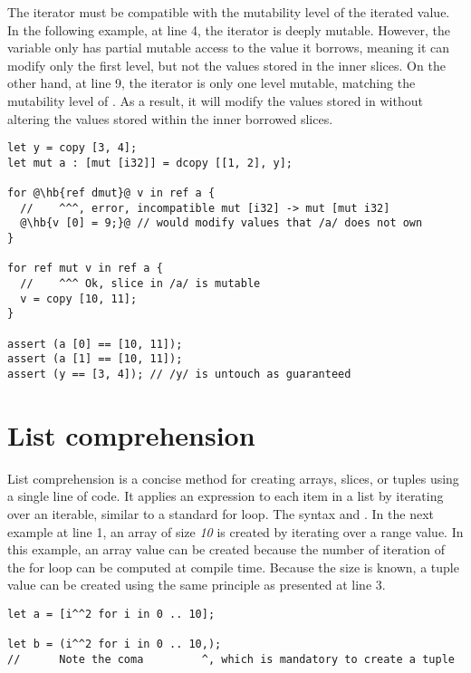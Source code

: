 The iterator must be compatible with the mutability level of the iterated value.
In the following example, at line 4, the iterator is deeply mutable. However,
the variable  only has partial mutable access to the value it borrows,
meaning it can modify only the first level, but not the values stored in the
inner slices. On the other hand, at line 9, the iterator is only one level
mutable, matching the mutability level of . As a result, it will modify
the values stored in  without altering the values stored within the
inner borrowed slices.

\begin{lstlisting}[style=coloredverbatim, escapechar=@]
let y = copy [3, 4];
let mut a : [mut [i32]] = dcopy [[1, 2], y];

for @\hb{ref dmut}@ v in ref a {
  //    ^^^, error, incompatible mut [i32] -> mut [mut i32]
  @\hb{v [0] = 9;}@ // would modify values that /a/ does not own
}

for ref mut v in ref a {
  //    ^^^ Ok, slice in /a/ is mutable
  v = copy [10, 11];
}

assert (a [0] == [10, 11]);
assert (a [1] == [10, 11]);
assert (y == [3, 4]); // /y/ is untouch as guaranteed

\end{lstlisting}

\section{List comprehension}%
\label{sec:list_compr}

List comprehension is a concise method for creating arrays, slices, or tuples
using a single line of code. It applies an expression to each item in a list by
iterating over an iterable, similar to a standard for loop. The syntax  and . In the next
example at line 1, an array of size \textit{10} is created by iterating over a
range value. In this example, an array value can be created because the number
of iteration of the for loop can be computed at compile time. Because the size
is known, a tuple value can be created using the same principle as presented at
line 3.

\begin{lstlisting}[style=coloredverbatim]
let a = [i^^2 for i in 0 .. 10];

let b = (i^^2 for i in 0 .. 10,);
//      Note the coma         ^, which is mandatory to create a tuple
\end{lstlisting}

